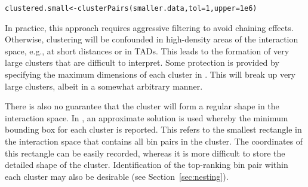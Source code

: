 \documentclass{report}\usepackage[]{graphicx}\usepackage[usenames,dvipsnames]{color}
\newcommand{\hlnum}[1]{\textcolor[rgb]{0.816,0.125,0.439}{#1}}%
\newcommand{\hlopt}[1]{\textcolor[rgb]{0,0,0}{#1}}%
\newcommand{\hlstd}[1]{\textcolor[rgb]{0.251,0.251,0.251}{#1}}%
\newcommand{\hlkwb}[1]{\textcolor[rgb]{0,0,0}{#1}}%
\newcommand{\hlkwc}[1]{\textcolor[rgb]{0.251,0.251,0.251}{#1}}%
\newcommand{\hlkwd}[1]{\textcolor[rgb]{0.878,0.439,0.125}{#1}}%
\newenvironment{knitrout}{}{} %
\begin{document}
\begin{knitrout}
\color{fgcolor}\begin{kframe}
\begin{alltt}
\hlstd{clustered.small} \hlkwb{<-} \hlkwd{clusterPairs}\hlstd{(smaller.data,} \hlkwc{tol}\hlstd{=}\hlnum{1}\hlstd{,} \hlkwc{upper}\hlstd{=}\hlnum{1e6}\hlstd{)}
\end{alltt}
\end{kframe}
\end{knitrout}

In practice, this approach requires aggressive filtering to avoid chaining effects.
Otherwise, clustering will be confounded in high-density areas of the interaction space, e.g., at short distances or in TADs.
This leads to the formation of very large clusters that are difficult to interpret.
Some protection is provided by specifying the maximum dimensions of each cluster in .
This will break up very large clusters, albeit in a somewhat arbitrary manner.

There is also no guarantee that the cluster will form a regular shape in the interaction space.
In , an approximate solution is used whereby the minimum bounding box for each cluster is reported.
This refers to the smallest rectangle in the interaction space that contains all bin pairs in the cluster.
The coordinates of this rectangle can be easily recorded, whereas it is more difficult to store the detailed shape of the cluster.
Identification of the top-ranking bin pair within each cluster may also be desirable (see Section~\ref{sec:nesting}).

\begin{knitrout}
\color{fgcolor}
\end{knitrout}
\end{document}
